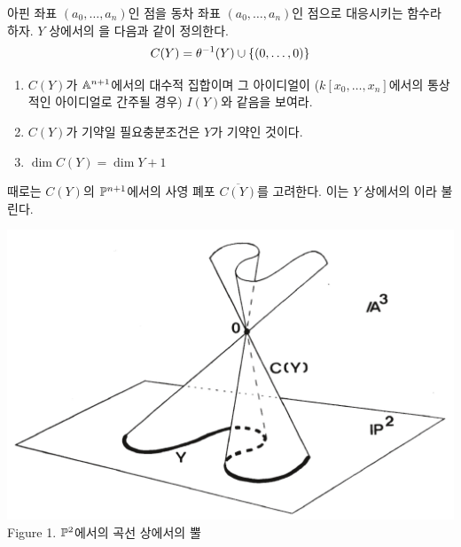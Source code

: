 \begin{enumerate}[label=\tb{2.\arabic*.},itemindent=0mm,itemsep=2mm]
	아핀 좌표 $(a_0,\ldots,a_n)$인 점을 동차 좌표 $(a_0,\ldots,a_n)$인 점으로 대응시키는 함수라 하자.
	$Y$ 상에서의 을 다음과 같이 정의한다.
	$$C(Y)=\theta^{-1}(Y)\cup\{(0,\ldots,0)\}$$
	\begin{enumerate}[label=(\alph*)]
	\item $C(Y)$가 $\mathbb{A}^{n+1}$에서의 대수적 집합이며 그 아이디얼이
	($k[x_0,\ldots,x_n]$에서의 통상적인 아이디얼로 간주될 경우) $I(Y)$와 같음을 보여라.
	\item $C(Y)$가 기약일 필요충분조건은 $Y$가 기약인 것이다.
	\item $\dim C(Y)=\dim Y+1$
	\end{enumerate}
	때로는 $C(Y)$의 $\mathbb{P}^{n+1}$에서의 사영 폐포 $\overline{C(Y)}$를 고려한다.
	이는 $Y$ 상에서의 이라 불린다.
	\end{enumerate}
	\newpage
	\begin{center}
		\includegraphics[width=0.5\columnwidth]{Figure1}\\
		Figure 1. $\mathbb{P}^2$에서의 곡선 상에서의 뿔
	\end{center}
